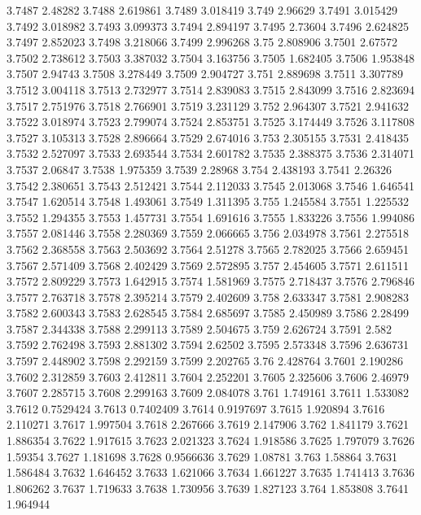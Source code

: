 3.7487  2.48282
3.7488  2.619861
3.7489  3.018419
3.749  2.96629
3.7491  3.015429
3.7492  3.018982
3.7493  3.099373
3.7494  2.894197
3.7495  2.73604
3.7496  2.624825
3.7497  2.852023
3.7498  3.218066
3.7499  2.996268
3.75  2.808906
3.7501  2.67572
3.7502  2.738612
3.7503  3.387032
3.7504  3.163756
3.7505  1.682405
3.7506  1.953848
3.7507  2.94743
3.7508  3.278449
3.7509  2.904727
3.751  2.889698
3.7511  3.307789
3.7512  3.004118
3.7513  2.732977
3.7514  2.839083
3.7515  2.843099
3.7516  2.823694
3.7517  2.751976
3.7518  2.766901
3.7519  3.231129
3.752  2.964307
3.7521  2.941632
3.7522  3.018974
3.7523  2.799074
3.7524  2.853751
3.7525  3.174449
3.7526  3.117808
3.7527  3.105313
3.7528  2.896664
3.7529  2.674016
3.753  2.305155
3.7531  2.418435
3.7532  2.527097
3.7533  2.693544
3.7534  2.601782
3.7535  2.388375
3.7536  2.314071
3.7537  2.06847
3.7538  1.975359
3.7539  2.28968
3.754  2.438193
3.7541  2.26326
3.7542  2.380651
3.7543  2.512421
3.7544  2.112033
3.7545  2.013068
3.7546  1.646541
3.7547  1.620514
3.7548  1.493061
3.7549  1.311395
3.755  1.245584
3.7551  1.225532
3.7552  1.294355
3.7553  1.457731
3.7554  1.691616
3.7555  1.833226
3.7556  1.994086
3.7557  2.081446
3.7558  2.280369
3.7559  2.066665
3.756  2.034978
3.7561  2.275518
3.7562  2.368558
3.7563  2.503692
3.7564  2.51278
3.7565  2.782025
3.7566  2.659451
3.7567  2.571409
3.7568  2.402429
3.7569  2.572895
3.757  2.454605
3.7571  2.611511
3.7572  2.809229
3.7573  1.642915
3.7574  1.581969
3.7575  2.718437
3.7576  2.796846
3.7577  2.763718
3.7578  2.395214
3.7579  2.402609
3.758  2.633347
3.7581  2.908283
3.7582  2.600343
3.7583  2.628545
3.7584  2.685697
3.7585  2.450989
3.7586  2.28499
3.7587  2.344338
3.7588  2.299113
3.7589  2.504675
3.759  2.626724
3.7591  2.582
3.7592  2.762498
3.7593  2.881302
3.7594  2.62502
3.7595  2.573348
3.7596  2.636731
3.7597  2.448902
3.7598  2.292159
3.7599  2.202765
3.76  2.428764
3.7601  2.190286
3.7602  2.312859
3.7603  2.412811
3.7604  2.252201
3.7605  2.325606
3.7606  2.46979
3.7607  2.285715
3.7608  2.299163
3.7609  2.084078
3.761  1.749161
3.7611  1.533082
3.7612  0.7529424
3.7613  0.7402409
3.7614  0.9197697
3.7615  1.920894
3.7616  2.110271
3.7617  1.997504
3.7618  2.267666
3.7619  2.147906
3.762  1.841179
3.7621  1.886354
3.7622  1.917615
3.7623  2.021323
3.7624  1.918586
3.7625  1.797079
3.7626  1.59354
3.7627  1.181698
3.7628  0.9566636
3.7629  1.08781
3.763  1.58864
3.7631  1.586484
3.7632  1.646452
3.7633  1.621066
3.7634  1.661227
3.7635  1.741413
3.7636  1.806262
3.7637  1.719633
3.7638  1.730956
3.7639  1.827123
3.764  1.853808
3.7641  1.964944
